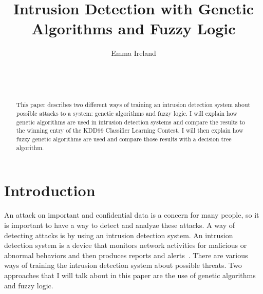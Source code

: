 \documentclass{sig-alternate}
\begin{document}

\title{Intrusion Detection with Genetic Algorithms and Fuzzy Logic}


\author{
\alignauthor
Emma Ireland\\
	\\
	\\
	\\
}

\maketitle
\begin{abstract}
This paper describes two different ways of training an intrusion detection system about possible attacks to a system: genetic algorithms and fuzzy logic. I will explain how genetic algorithms are used in intrusion detection systems and compare the results to the winning entry of the KDD99 Classifier Learning Contest. I will then explain how fuzzy genetic algorithms are used and compare those results with a decision tree algorithm.
\end{abstract}




\section{Introduction}
An attack on important and confidential data is a concern for many people, so it is important to have a way to detect and analyze these attacks. A way of detecting attacks is by using an intrusion detection system. An intrusion detection system is a device that monitors network activities for malicious or abnormal behaviors and then produces reports and alerts~\cite{DBLP:journals/corr/abs-1204-1336}. There are various ways of training the intrusion detection system about possible threats. Two approaches that I will talk about in this paper are the use of genetic algorithms and fuzzy logic.
\end{document}
